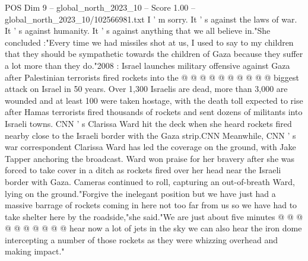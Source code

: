 \begin{textsample}{POS Dim 9 – global\_north\_2023\_10 – Score 1.00 – global\_north\_2023\_10/102566981.txt}
I ' m sorry.
It ' s against the laws of war.
It ' s against humanity.
It ' s against anything that we all believe in."She concluded :"Every time we had missiles shot at us, I used to say to my children that they should be sympathetic towards the children of Gaza because they suffer a lot more than they do."2008 : Israel launches military offensive against Gaza after Palestinian terrorists fired rockets into the @ @ @ @ @ @ @ @ @ @ biggest attack on Israel in 50 years.
Over 1,300 Israelis are dead, more than 3,000 are wounded and at least 100 were taken hostage, with the death toll expected to rise after Hamas terrorists fired thousands of rockets and sent dozens of militants into Israeli towns.
CNN ' s Clarissa Ward hit the deck when she heard rockets fired nearby close to the Israeli border with the Gaza strip.CNN Meanwhile, CNN ' s war correspondent Clarissa Ward has led the coverage on the ground, with Jake Tapper anchoring the broadcast.
Ward won praise for her bravery after she was forced to take cover in a ditch as rockets fired over her head near the Israeli border with Gaza.
Cameras continued to roll, capturing an out-of-breath Ward, lying on the ground."Forgive the inelegant position but we have just had a massive barrage of rockets coming in here not too far from us so we have had to take shelter here by the roadside,"she said."We are just about five minutes @ @ @ @ @ @ @ @ @ @ hear now a lot of jets in the sky we can also hear the iron dome intercepting a number of those rockets as they were whizzing overhead and making impact."

\end{textsample}
